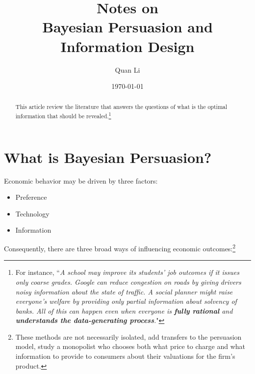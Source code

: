 \documentclass[12pt,letterpaper]{article}
\theoremstyle{definition}   %
\begin{document}
\title{\textbf{Notes on \cite{kamenica2019bayesian}}\\{\small \textbf{Bayesian Persuasion and Information Design}}}
\author{Quan Li}
\date{\today}
\maketitle

\begin{abstract}
This article review the literature that answers the questions of what is the optimal information that should be revealed.\footnote{For instance,	``\textit{A school may improve its students’ job outcomes if it issues only coarse grades. Google can reduce congestion on roads by giving drivers noisy information about the state of traffic. A social planner might raise everyone’s welfare by providing only partial information about solvency of banks. All of this can happen even when everyone is \textbf{fully rational} and \textbf{understands the data-generating process}.}"} 
\end{abstract}


\section{What is Bayesian Persuasion?}



  
Economic behavior may be driven by three factors:
\begin{itemize}
	\item Preference
	\item Technology
	\item Information
\end{itemize}

Consequently, there are three broad ways of influencing economic outcomes:\footnote{These methods are not necessarily isolated, \cite{li2017model} add transfers to the persuasion model, \cite{lewis1994supplying} study a monopolist who chooses both what price to charge and what information to provide to consumers about their valuations for the firm's product.}
\end{document}
